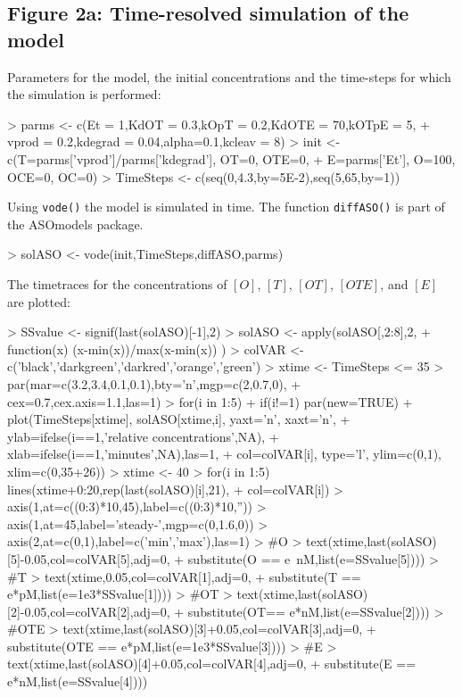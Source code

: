 \documentclass{article}
\begin{document}
\subsection*{Figure 2a: Time-resolved simulation of the model}
Parameters for the model, the initial concentrations and the time-steps for which the simulation is performed:
\begin{Schunk}
\begin{Sinput}
> parms <- c(Et = 1,KdOT = 0.3,kOpT = 0.2,KdOTE = 70,kOTpE = 5,  
+            vprod = 0.2,kdegrad = 0.04,alpha=0.1,kcleav = 8)
> init <- c(T=parms['vprod']/parms['kdegrad'], OT=0, OTE=0, 
+           E=parms['Et'], O=100, OCE=0, OC=0)
> TimeSteps <- c(seq(0,4.3,by=5E-2),seq(5,65,by=1))
\end{Sinput}
\end{Schunk}
Using \texttt{vode()} the model is simulated in time. The function \texttt{diffASO()} is part of the ASOmodels package. 
\begin{Schunk}
\begin{Sinput}
> solASO <- vode(init,TimeSteps,diffASO,parms)
\end{Sinput}
\end{Schunk}
The timetraces for the concentrations of $[O]$, $[T]$, $[OT]$, $[OTE]$, and $[E]$ are plotted:
\begin{Schunk}
\begin{Sinput}
> SSvalue <- signif(last(solASO)[-1],2)
> solASO <- apply(solASO[,2:8],2,
+                 function(x) (x-min(x))/max(x-min(x)) )
> colVAR <- c('black','darkgreen','darkred','orange','green')
> xtime <- TimeSteps <= 35
> par(mar=c(3.2,3.4,0.1,0.1),bty='n',mgp=c(2,0.7,0),
+     cex=0.7,cex.axis=1.1,las=1)
> for(i in 1:5){ 
+   if(i!=1) par(new=TRUE)
+   plot(TimeSteps[xtime], solASO[xtime,i], yaxt='n', xaxt='n',
+        ylab=ifelse(i==1,'relative concentrations',NA), 
+        xlab=ifelse(i==1,'minutes',NA),las=1, 
+        col=colVAR[i], type='l', ylim=c(0,1), xlim=c(0,35+26)) }
> xtime <- 40
> for(i in 1:5) lines(xtime+0:20,rep(last(solASO)[i],21),
+                     col=colVAR[i])
> axis(1,at=c((0:3)*10,45),label=c((0:3)*10,''))
> axis(1,at=45,label='steady-\nstate',mgp=c(0,1.6,0))
> axis(2,at=c(0,1),label=c('min','max'),las=1)
> #O
> text(xtime,last(solASO)[5]-0.05,col=colVAR[5],adj=0,
+      substitute(O == e~nM,list(e=SSvalue[5])))
> #T
> text(xtime,0.05,col=colVAR[1],adj=0,
+      substitute(T == e*pM,list(e=1e3*SSvalue[1])))
> #OT
> text(xtime,last(solASO)[2]-0.05,col=colVAR[2],adj=0,
+      substitute(OT== e*nM,list(e=SSvalue[2])))
> #OTE
> text(xtime,last(solASO)[3]+0.05,col=colVAR[3],adj=0,
+      substitute(OTE == e*pM,list(e=1e3*SSvalue[3])))
> #E
> text(xtime,last(solASO)[4]+0.05,col=colVAR[4],adj=0,
+      substitute(E == e*nM,list(e=SSvalue[4])))
\end{Sinput}
\end{Schunk}
\end{document}
